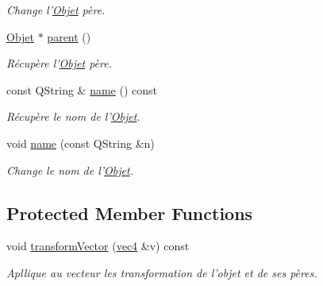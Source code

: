 \begin{DoxyCompactItemize}
\begin{DoxyCompactList}\small\item\em Change l'\hyperlink{class_objet}{Objet} père. \end{DoxyCompactList}\item 
\hyperlink{class_objet}{Objet} $\ast$ \hyperlink{class_objet_aaa3c3290e5bb742363263600fcdb3e5e}{parent} ()
\begin{DoxyCompactList}\small\item\em Récupère l'\hyperlink{class_objet}{Objet} père. \end{DoxyCompactList}\item 
const Q\+String \& \hyperlink{class_objet_a4a702c189bedcbf1e65da6aec72c8e44}{name} () const 
\begin{DoxyCompactList}\small\item\em Récupère le nom de l'\hyperlink{class_objet}{Objet}. \end{DoxyCompactList}\item 
void \hyperlink{class_objet_a9fcc9af481f4e13f46ab7d1b40cf91fc}{name} (const Q\+String \&n)
\begin{DoxyCompactList}\small\item\em Change le nom de l'\hyperlink{class_objet}{Objet}. \end{DoxyCompactList}\end{DoxyCompactItemize}
\subsection*{Protected Member Functions}
\begin{DoxyCompactItemize}
\item 
void \hyperlink{class_objet_a68db2971ff359da981bc0fb73a164b9f}{transform\+Vector} (\hyperlink{structvec4}{vec4} \&v) const 
\begin{DoxyCompactList}\small\item\em Apllique au vecteur les transformation de l'objet et de ses pères. \end{DoxyCompactList}\end{DoxyCompactItemize}
